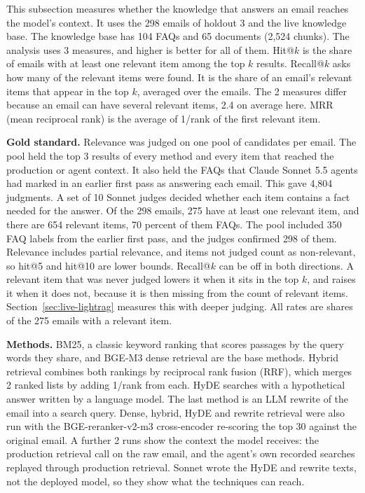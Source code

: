 This subsection measures whether the knowledge that answers an email reaches the model's context. It uses the 298 emails of holdout 3 and the live knowledge base. The knowledge base has 104 FAQs and 65 documents (2,524 chunks). The analysis uses 3 measures, and higher is better for all of them. Hit@$k$ is the share of emails with at least one relevant item among the top $k$ results. Recall@$k$ asks how many of the relevant items were found. It is the share of an email's relevant items that appear in the top $k$, averaged over the emails. The 2 measures differ because an email can have several relevant items, 2.4 on average here. MRR (mean reciprocal rank) is the average of 1/rank of the first relevant item.

\textbf{Gold standard.} Relevance was judged on one pool of candidates per email. The pool held the top 3 results of every method and every item that reached the production or agent context. It also held the FAQs that Claude Sonnet 5.5 agents had marked in an earlier first pass as answering each email. This gave 4,804 judgments. A set of 10 Sonnet judges decided whether each item contains a fact needed for the answer. Of the 298 emails, 275 have at least one relevant item, and there are 654 relevant items, 70 percent of them FAQs. The pool included 350 FAQ labels from the earlier first pass, and the judges confirmed 298 of them. Relevance includes partial relevance, and items not judged count as non-relevant, so hit@5 and hit@10 are lower bounds. Recall@$k$ can be off in both directions. A relevant item that was never judged lowers it when it sits in the top $k$, and raises it when it does not, because it is then missing from the count of relevant items. Section~\ref{sec:live-lightrag} measures this with deeper judging. All rates are shares of the 275 emails with a relevant item.

\textbf{Methods.} BM25, a classic keyword ranking that scores passages by the query words they share, and BGE-M3 dense retrieval are the base methods. Hybrid retrieval combines both rankings by reciprocal rank fusion (RRF), which merges 2 ranked lists by adding 1/rank from each. HyDE searches with a hypothetical answer written by a language model. The last method is an LLM rewrite of the email into a search query. Dense, hybrid, HyDE and rewrite retrieval were also run with the BGE-reranker-v2-m3 cross-encoder re-scoring the top 30 against the original email. A further 2 runs show the context the model receives: the production retrieval call on the raw email, and the agent's own recorded searches replayed through production retrieval. Sonnet wrote the HyDE and rewrite texts, not the deployed model, so they show what the techniques can reach.

